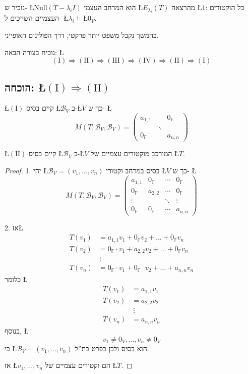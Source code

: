 \documentclass[english,hebrew]{article}
\begin{document}
נזכיר ש{\beginL -\endL} \L{$\text{Null}(T-\lambda_{i}I)$} הוא המרחב
העצמי \L{$E_{\lambda_{i}}(T)$} מהרצאה \L{$1$}: כל הוקטורים העצמיים
השייכים ל- \L{$\lambda_{i}$} ו- \L{$0_{V}$}.

בהמשך נקבל משפט יותר פרקטי, דרך הפולינום האופייני.

נוכיח בצורה הבאה: \L{%
\[
(\text{I})\Rightarrow(\text{II})\Rightarrow(\text{III})\Rightarrow(\text{IV})\Rightarrow(\text{II})\Rightarrow(\text{I})
\]
}%

\subsection{הוכחה: \L{$(\text{I})\Rightarrow(\text{II})$}}

\L{$(\text{I})$} קיים בסיס \L{$\mathcal{B}_{V}$} ב-\L{$V$} כך ש-
\L{%
\[
M(T,\mathcal{B}_{V},\mathcal{B}_{V})=\begin{pmatrix}a_{1,1} &  & 0_{\mathbb{F}}\\
 & \ddots\\
0_{\mathbb{F}} &  & a_{n,n}
\end{pmatrix}
\]
}%

\L{$(\text{II})$} קיים בסיס \L{$\mathcal{B}_{V}$} ב-\L{$V$} המורכב
מוקטורים עצמיים של \L{$T$}.
\begin{proof}
1. יהי \L{$\mathcal{B}_{V}=(v_{1},\dots,v_{n})$} בסיס במרחב וקטורי
\L{$V$} כך ש- \L{%
\[
M(T,\mathcal{B}_{V},\mathcal{B}_{V})=\begin{pmatrix}a_{1,1} & 0_{\mathbb{F}} & \cdots & 0_{\mathbb{F}}\\
0_{\mathbb{F}} & a_{2,2} & \cdots & 0_{\mathbb{F}}\\
\vdots &  & \ddots & \vdots\\
0_{\mathbb{F}} & 0_{\mathbb{F}} & \cdots & a_{n,n}
\end{pmatrix}
\]
}%

2. אז\L{%
\begin{align*}
T(v_{1}) & =a_{1,1}v_{1}+0_{\mathbb{F}}v_{2}+\dots+0_{\mathbb{F}}v_{n}\\
T(v_{2}) & =0_{\mathbb{F}}\cdot v_{1}+a_{2,2}v_{2}+\dots+0_{\mathbb{F}}v_{n}\\
 & \ \vdots\\
T(v_{n}) & =0_{\mathbb{F}}\cdot v_{1}+0_{\mathbb{F}}\cdot v_{2}+\dots+a_{n,n}v_{n}
\end{align*}
}%
כלומר \L{%
\begin{align*}
T(v_{1}) & =a_{1,1}v_{1}\\
T(v_{2}) & =a_{2,2}v_{2}\\
 & \ \vdots\\
T(v_{n}) & =a_{n,n}v_{n}
\end{align*}
}%
בנוסף, \L{%
\[
v_{1}\neq0_{V},\dots,v_{n}\neq0_{V}
\]
}%
 כי \L{$\mathcal{B}_{V}=(v_{1},\dots,v_{n})$} הוא בסיס ולכן בפרט
בת\textquotedblright ל. 

אז \L{$v_{1},\dots,v_{n}$} הם וקטורים עצמיים של \L{$T$}.
\end{proof}
\end{document}

